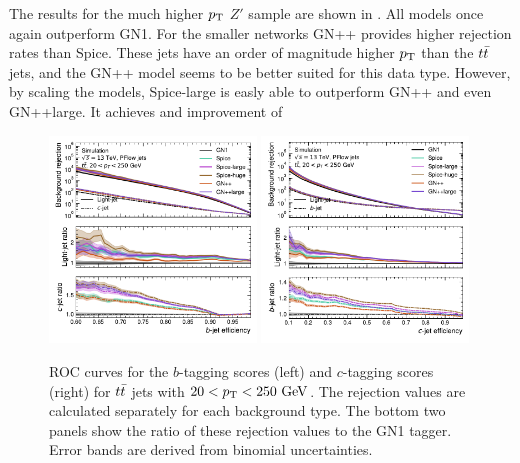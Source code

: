 The results for the much higher $p_{\text{T}}$ $Z'$ sample are shown in .
All models once again outperform GN1.
For the smaller networks GN++ provides higher rejection rates than Spice.
These jets have an order of magnitude higher $p_{\text{T}}$ than the $t\bar{t}$ jets, and the GN++ model seems to be better suited for this data type.
However, by scaling the models, Spice-large is easly able to outperform GN++ and even GN++large.
It achieves and improvement of



\begin{figure}[ht]
    \centering
    \includegraphics[width=0.49\textwidth]{figures/flavour_tagging/b_roc_ttbar_large.pdf}
    \includegraphics[width=0.49\textwidth]{figures/flavour_tagging/c_roc_ttbar_large.pdf}
    \caption{ROC curves for the $b$-tagging scores (left) and $c$-tagging scores (right) for $t\bar{t}$ jets with $20 < \pt < 250~\GeV$. The rejection values are calculated separately for each background type. The bottom two panels show the ratio of these rejection values to the GN1 tagger. Error bands are derived from binomial uncertainties.}
    \label{fig:ttbar_roc}
\end{figure}

